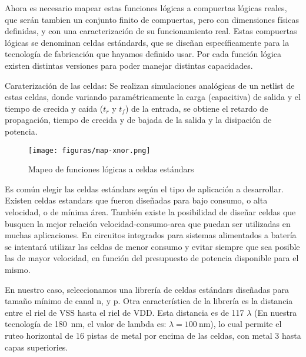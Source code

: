 Ahora es necesario mapear estas funciones lógicas a compuertas lógicas reales, que serán tambien un conjunto finito de compuertas, pero con dimensiones físicas definidas, y con una caracterización de su funcionamiento real. Estas compuertas lógicas se denominan celdas estándards, que se diseñan específicamente para la tecnología de fabricación que hayamos definido usar. Por cada función lógica existen distintas versiones para poder manejar distintas capacidades. 

Caraterización de las celdas: Se realizan simulaciones analógicas de un netlist de estas celdas, donde variando paramétricamente la carga (capacitiva) de salida y el tiempo de crecida y caída ($t_r$ y $t_f$) de la entrada, se obtiene el retardo de propagación, tiempo de crecida y de bajada de la salida y la disipación de potencia.



\begin{figure}[h]
\centering
\texttt{[image: figuras/map-xnor.png]}
  \caption{Mapeo de funciones lógicas a celdas estándars}
  \label{fig:map-xnor}
\end{figure}

Es común elegir las celdas estándars según el tipo de aplicación a desarrollar. Existen celdas estandars que fueron diseñadas para bajo consumo, o alta velocidad, o de mínima área. También existe la posibilidad de diseñar celdas que busquen la mejor relación velocidad-consumo-area que puedan ser utilizadas en muchas aplicaciones. En circuitos integrados para sistemas alimentados a batería se intentará utilizar las celdas de menor consumo y evitar siempre que sea posible las de mayor velocidad, en función del presupuesto de potencia disponible para el mismo.

En nuestro caso, seleccionamos una librería de celdas estándars diseñadas para tamaño mínimo de canal n, y p. %
Otra característica de la librería es la distancia entre el riel de VSS hasta el riel de VDD. Esta distancia es de 117 $\lambda$ (En nuestra tecnología de 180~$\mathrm{nm}$, el valor de lambda es: $\lambda = 100~\mathrm{nm}$), lo cual permite el ruteo horizontal de 16 pistas de metal por encima de las celdas, con metal 3 hasta capas superiories.

 


